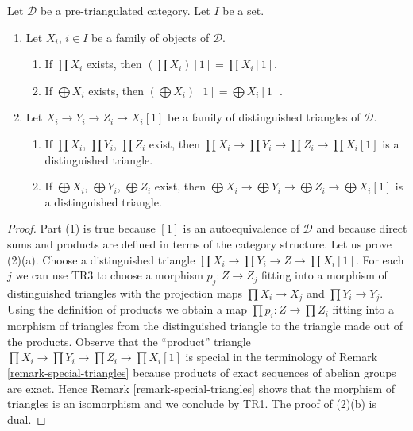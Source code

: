 \begin{lemma}
\label{lemma-products-sums-shifts-triangles}
Let $\mathcal{D}$ be a pre-triangulated category.
Let $I$ be a set.
\begin{enumerate}
\item Let $X_i$, $i \in I$ be a family of objects of $\mathcal{D}$.
\begin{enumerate}
\item If $\prod X_i$ exists, then $(\prod X_i)[1] = \prod X_i[1]$.
\item If $\bigoplus X_i$ exists, then $(\bigoplus X_i)[1] = \bigoplus X_i[1]$.
\end{enumerate}
\item Let $X_i \to Y_i \to Z_i \to X_i[1]$ be a family of distinguished
triangles of $\mathcal{D}$.
\begin{enumerate}
\item If $\prod X_i$, $\prod Y_i$, $\prod Z_i$ exist, then
$\prod X_i \to \prod Y_i \to \prod Z_i \to \prod X_i[1]$
is a distinguished triangle.
\item If $\bigoplus X_i$, $\bigoplus Y_i$,
$\bigoplus Z_i$ exist, then
$\bigoplus X_i \to \bigoplus Y_i \to \bigoplus Z_i \to \bigoplus X_i[1]$
is a distinguished triangle.
\end{enumerate}
\end{enumerate}
\end{lemma}

\begin{proof}
Part (1) is true because $[1]$ is an autoequivalence of $\mathcal{D}$
and because direct sums and products are defined in terms of the
category structure. Let us prove (2)(a). Choose a distinguished triangle
$\prod X_i \to \prod Y_i \to Z \to \prod X_i[1]$. For each $j$ we can
use TR3 to choose a morphism $p_j : Z \to Z_j$
fitting into a morphism of distinguished
triangles with the projection maps $\prod X_i \to X_j$ and $\prod Y_i \to Y_j$.
Using the definition of products we obtain a map
$\prod p_i : Z \to \prod Z_i$ fitting into a morphism
of triangles from the distinguished triangle to the triangle
made out of the products. Observe that the ``product'' triangle
$\prod X_i \to \prod Y_i \to \prod Z_i \to \prod X_i[1]$
is special in the terminology of Remark \ref{remark-special-triangles}
because products of exact sequences of abelian groups are exact.
Hence Remark \ref{remark-special-triangles} shows that
the morphism of triangles is an isomorphism and we conclude by TR1.
The proof of (2)(b) is dual.
\end{proof}

